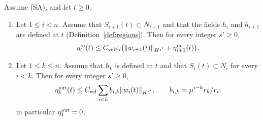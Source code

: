 \begin{lemma}
\label{lem:transfer-step}
Assume (SA), and let $t\ge0$.
\begin{enumerate}[label=\textup{(\arabic*)}]
\item Let $1\le i<n$. Assume that $S_{i+1}(t)\subset N_{i+1}$ and that the fields
  $h_i$ and $h_{i+1}$ are defined at $t$ (Definition~\ref{def:regions}). Then for
  every integer $s'\ge0$,
  \begin{equation}
  \label{eq:transfer-step-inner}
  \eta^{\mathrm{in}}_i(t)\le C_{\mathrm{vel}} \varepsilon_i\big(\|w_{i+1}(t)\|_{H^{s'}}+\eta^{\mathrm{in}}_{i+1}(t)\big).
  \end{equation}
\item Let $1\le k\le n$. Assume that $h_k$ is defined at $t$ and that
  $S_i(t)\subset N_i$ for every $i<k$. Then for every integer $s'\ge0$,
  \begin{equation}
  \label{eq:transfer-step-outer}
  \eta^{\mathrm{out}}_k(t)\le C_{\mathrm{vel}} \sum_{i<k}b_{i,k}\|w_i(t)\|_{H^{s'}},\qquad b_{i,k}=\mu^{i-k}r_k/r_i;
  \end{equation}
  in particular $\eta^{\mathrm{out}}_1=0$.
\end{enumerate}
\end{lemma}
